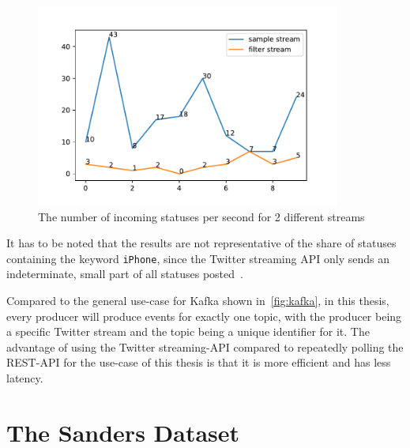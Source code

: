 \begin{figure}
    \centering
    \caption{The number of incoming statuses per second for 2 different streams}
    \label{fig:stream_frequency}
    \includegraphics[width=10cm]{../figures/stream_frequencies.pdf}
\end{figure}

It has to be noted that the results are not representative of the share of statuses containing the keyword \texttt{iPhone},
since the Twitter streaming API only sends an indeterminate, small part of all statuses posted~\cite{twitterDocs}.

Compared to the general use-case for Kafka shown in~\cref{fig:kafka}, in this thesis,
every producer will produce events for exactly one topic, with the producer being a specific Twitter stream and the topic being a unique identifier for it.
The advantage of using the Twitter streaming-API compared to repeatedly polling the REST-API for the use-case of this thesis
is that it is more efficient and has less latency.

\section{The Sanders Dataset}
\label{sec:theSandersDataset}

